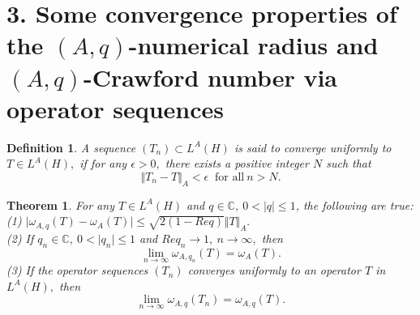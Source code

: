 \documentclass[preprint,12pt,3p]{elsarticle}
\newtheorem{definition}{Definition}
\newtheorem{theorem}{Theorem}
\begin{document}
\setcounter{section}{3}
\section*{\normalsize{3. Some convergence properties of the $ (A,q)$-numerical radius and $ (A,q)$-Crawford number via operator sequences}}

\begin{definition}
A sequence $ (T_{n}) \subset L^{A}(H) $ is said to converge uniformly to $ T\in L^{A}(H), $ if for any $ \epsilon >0 , $ there exists a positive integer $ N $ such that 
$$
\Vert T_{n}- T \Vert_{A} <\epsilon \ \text{ for all} \  n>N .
$$
\end{definition}

\begin{theorem}
\label{thm4}
For any $ T\in L^{A}(H) $ and $ q\in \mathbb{C}, \ 0<\vert q \vert\leq 1 $, the following are true: \\
(1) $ \vert \omega_{A,q}(T)-\omega_{A}(T)\vert\leq \sqrt{2(1-Req)}\Vert T \Vert_{A}. $ \\
(2) If $ q_{n}\in \mathbb{C}, \ 0<\vert q_{n} \vert \leq 1 $ and $ Req_{n}\rightarrow 1, \ n\rightarrow \infty, $ then 
$$
\lim\limits_{n\rightarrow \infty}\omega_{A,q_{n}}(T)=\omega_{A}(T).
$$
(3) If the operator sequences $ (T_{n})$ converges uniformly to an operator $ T $ in $ L^{A}(H), $ then
$$
\lim\limits_{n\rightarrow \infty}\omega_{A,q}(T_{n})=\omega_{A,q}(T).
$$
\end{theorem}
\end{document}
